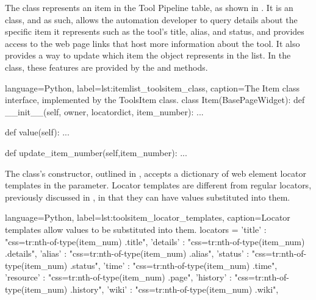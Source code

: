 
The  class represents an item in the Tool Pipeline table, as
shown in . It is an
 class, and as such, allows the automation developer to query
details about the specific item it represents such as the tool's title, alias,
and status, and provides access to the web page links that host more information
about the tool. It also provides a way to update which item the object
represents in the list. In the  class, these features are
provided by the  and 
methods.


\begin{xcode}{%
  language=Python,%
  label=lst:itemlist_toolsitem_class,%
  caption={The Item class interface, implemented by the ToolsItem class.}%
}
class Item(BasePageWidget):
    def __init__(self, owner, locatordict, item_number):
        ...

    def value(self):
        ...

    def update_item_number(self,item_number):
        ...
\end{xcode}

The  class's constructor, outlined in
, accepts a dictionary of web element
locator templates in the  parameter. Locator templates
\cite{pushtotest_ag_po:2011:Online} are different from regular locators,
previously discussed in , in
that they can have values substituted into them.

\begin{xcode}{%
  language=Python,%
  label=lst:toolsitem_locator_templates,%
  caption={Locator templates allow values to be substituted into them.}%
}
    locators = {
        'title'    : "css=tr:nth-of-type({item_num}) .title",
        'details'  : "css=tr:nth-of-type({item_num}) .details",
        'alias'    : "css=tr:nth-of-type({item_num}) .alias",
        'status'   : "css=tr:nth-of-type({item_num}) .status",
        'time'     : "css=tr:nth-of-type({item_num}) .time",
        'resource' : "css=tr:nth-of-type({item_num}) .page",
        'history'  : "css=tr:nth-of-type({item_num}) .history",
        'wiki'     : "css=tr:nth-of-type({item_num}) .wiki",
    }
\end{xcode}

